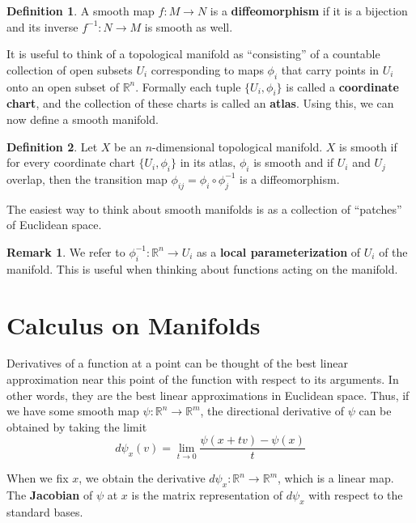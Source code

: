 \documentclass[reqno]{amsart}
\theoremstyle{definition}
\newtheorem{defn}{Definition}[section]
\newtheorem{rem}{Remark}[section]
\numberwithin{equation}{section}
\begin{document}
\begin{defn}
    A smooth map $f: M \to N$ is a \textbf{diffeomorphism} if it is a bijection and its inverse $f^{-1}: N \to M$ is smooth as well.
\end{defn}

It is useful to think of a topological manifold as ``consisting'' of a countable collection of open subsets $U_i$ corresponding to maps $\phi_i$ that carry points in $U_i$ onto an open subset of $\mathbb{R}^n$. Formally each tuple $\{U_i, \phi_i\}$ is called a \textbf{coordinate chart}, and the collection of these charts is called an \textbf{atlas}. Using this, we can now define a smooth manifold.

\begin{defn}
    Let $X$ be an $n$-dimensional topological manifold. $X$ is smooth if for every coordinate chart $\{U_i, \phi_i\}$ in its atlas, $\phi_i$ is smooth and if $U_i$ and $U_j$ overlap, then the transition map $\phi_{ij} = \phi_i \circ \phi_j^{-1}$ is a diffeomorphism.
\end{defn}

The easiest way to think about smooth manifolds is as a collection of ``patches'' of Euclidean space.

\begin{rem}
    We refer to $\phi_i^{-1}: \mathbb{R}^n \to U_i$ as a \textbf{local parameterization} of $U_i$ of the manifold. This is useful when thinking about functions acting on the manifold.
\end{rem}

\section{Calculus on Manifolds}

Derivatives of a function at a point can be thought of the best linear approximation near this point of the function with respect to its arguments. In other words, they are the best linear approximations in Euclidean space. Thus, if we have some smooth map $\psi: \mathbb{R}^n \to \mathbb{R}^m$, the directional derivative of $\psi$ can be obtained by taking the limit
\begin{equation*}
    d\psi_x(v) = \lim_{t \to 0}\frac{\psi(x + tv) - \psi(x)}{t}
\end{equation*}

When we fix $x$, we obtain the derivative $d\psi_x: \mathbb{R}^n \to \mathbb{R}^m$, which is a linear map. The \textbf{Jacobian} of $\psi$ at $x$ is the matrix representation of $d\psi_x$ with respect to the standard bases. 
\end{document}
